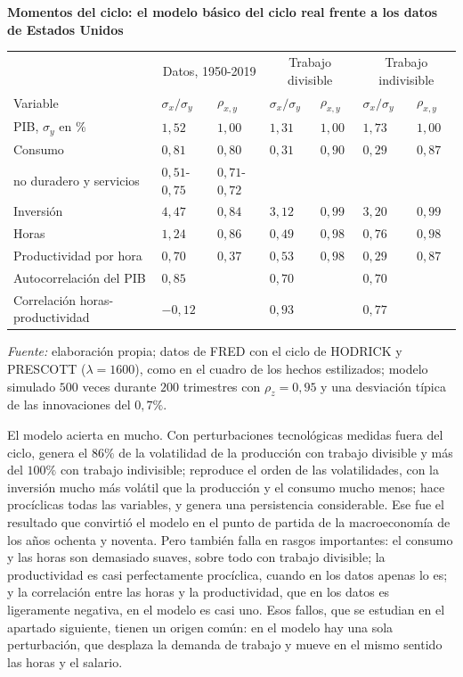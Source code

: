 \documentclass[10pt,a4paper]{article}
\begin{document}
\begin{center}\begin{minipage}{\linewidth}\centering
{\small\textbf{Momentos del ciclo: el modelo básico del ciclo real frente a los datos de Estados Unidos}}\par\vspace{0.4em}
{\footnotesize
\begin{tabular}{p{4.3cm}p{1.15cm}p{1.15cm}p{1.15cm}p{1.15cm}p{1.15cm}p{1.15cm}}
\hline
 & \multicolumn{2}{c}{Datos, 1950-2019} & \multicolumn{2}{c}{Trabajo divisible} & \multicolumn{2}{c}{Trabajo indivisible}\tabularnewline
Variable & $\sigma_x/\sigma_y$ & $\rho_{x,y}$ & $\sigma_x/\sigma_y$ & $\rho_{x,y}$ & $\sigma_x/\sigma_y$ & $\rho_{x,y}$\tabularnewline
\hline
PIB, $\sigma_y$ en \% & $1{,}52$ & $1{,}00$ & $1{,}31$ & $1{,}00$ & $1{,}73$ & $1{,}00$\tabularnewline
Consumo & $0{,}81$ & $0{,}80$ & $0{,}31$ & $0{,}90$ & $0{,}29$ & $0{,}87$\tabularnewline
\quad no duradero y servicios & $0{,}51$-$0{,}75$ & $0{,}71$-$0{,}72$ & & & & \tabularnewline
Inversión & $4{,}47$ & $0{,}84$ & $3{,}12$ & $0{,}99$ & $3{,}20$ & $0{,}99$\tabularnewline
Horas & $1{,}24$ & $0{,}86$ & $0{,}49$ & $0{,}98$ & $0{,}76$ & $0{,}98$\tabularnewline
Productividad por hora & $0{,}70$ & $0{,}37$ & $0{,}53$ & $0{,}98$ & $0{,}29$ & $0{,}87$\tabularnewline
\hline
Autocorrelación del PIB & \multicolumn{2}{l}{$0{,}85$} & \multicolumn{2}{l}{$0{,}70$} & \multicolumn{2}{l}{$0{,}70$}\tabularnewline
Correlación horas-productividad & \multicolumn{2}{l}{$-0{,}12$} & \multicolumn{2}{l}{$0{,}93$} & \multicolumn{2}{l}{$0{,}77$}\tabularnewline
\hline
\end{tabular}}\par\vspace{0.4em}
{\small\textit{Fuente: }elaboración propia; datos de FRED con el ciclo de HODRICK y PRESCOTT ($\lambda=1600$), como en el cuadro de los hechos estilizados; modelo simulado $500$ veces durante $200$ trimestres con $\rho_z=0{,}95$ y una desviación típica de las innovaciones del $0{,}7\%$.}
\end{minipage}\end{center}

El modelo acierta en mucho. Con perturbaciones tecnológicas medidas fuera del ciclo, genera el $86\%$ de la volatilidad de la producción con trabajo divisible y más del $100\%$ con trabajo indivisible; reproduce el orden de las volatilidades, con la inversión mucho más volátil que la producción y el consumo mucho menos; hace procíclicas todas las variables, y genera una persistencia considerable. Ese fue el resultado que convirtió el modelo en el punto de partida de la macroeconomía de los años ochenta y noventa. Pero también falla en rasgos importantes: el consumo y las horas son demasiado suaves, sobre todo con trabajo divisible; la productividad es casi perfectamente procíclica, cuando en los datos apenas lo es; y la correlación entre las horas y la productividad, que en los datos es ligeramente negativa, en el modelo es casi uno. Esos fallos, que se estudian en el apartado siguiente, tienen un origen común: en el modelo hay una sola perturbación, que desplaza la demanda de trabajo y mueve en el mismo sentido las horas y el salario.
\end{document}
